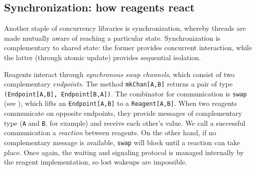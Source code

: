 \documentclass[preprint,nocopyrightspace]{sigplanconf}
\begin{document}



\subsection{Synchronization: how reagents react}
\label{sec:sync}


Another staple of concurrency libraries is synchronization, whereby
threads are made mutually aware of reaching a particular state.
Synchronization is complementary to shared state: the former
provides concurrent interaction, while the latter (through atomic
update) provides sequential isolation.  %

Reagents interact through \emph{synchronous swap channels}, which consist of two
complementary \emph{endpoints}.  The method \lstinline{mkChan[A,B]} returns a pair
of type \lstinline{(Endpoint[A,B], Endpoint[B,A])}.
The combinator for communication is \lstinline{swap} (see
), which lifts an \lstinline{Endpoint[A,B]} to a
\lstinline{Reagent[A,B]}.  When two reagents communicate on opposite
endpoints, they provide messages of complementary type (\lstinline{A}
and \lstinline{B}, for example) and receive each other's value.  We
call a successful communication a \emph{reaction} between reagents.
On the other hand, if no complementary message is available,
\lstinline{swap} will block until a reaction can take place.  Once
again, the waiting and signaling protocol is managed internally by
the reagent implementation, so lost wakeups are impossible.
\end{document}
